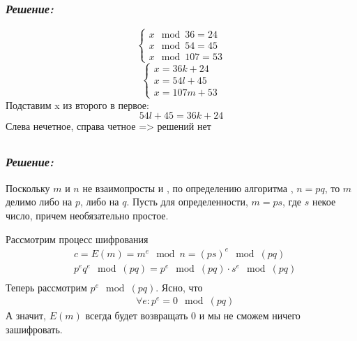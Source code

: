 \documentclass[a4paper, 11pt]{article} %
\newcommand*\circled[1]{\tikz[baseline=(char.base)]{
            \node[shape=circle,draw,inner sep=2pt] (char) {#1};}}
\begin{document}
\subsection*{\circled{5}} 
\subsubsection*{\textit{Решение:}}
\begin{equation}
\begin{cases}
x \mod 36 = 24\\
x \mod 54 = 45 \\
x \mod 107 = 53
\end{cases}
\end{equation} 
\begin{equation}
\begin{cases}
x = 36k + 24\\
x = 54l + 45 \\
x = 107m + 53
\end{cases}
\end{equation}
Подставим x из второго в первое:
\[54l + 45 = 36k + 24 \]
Слева нечетное, справа четное => решений нет
\subsection*{\circled{6}} 
\subsubsection*{\textit{Решение:}}
\par Поскольку $m$ и $n$ не взаимопросты и , по определению алгоритма , $n=pq$, то $m$ делимо либо на $p$, либо  на $q$. Пусть для определенности, $m=ps$, где $s$ некое число, причем необязательно простое. 
\par Рассмотрим процесс шифрования
\begin{align*}
&c = E(m) = m^e \mod n = (ps)^e \mod (pq)\\
&p^eq^e\mod(pq) = p^e\mod(pq)\cdot s^e\mod(pq)\\
\end{align*} 
Теперь рассмотрим $p^e\mod(pq)$. Ясно, что 
\begin{align*}
&\forall e : p^e = 0\mod(pq)
\end{align*}
А значит, $E(m)$ всегда будет возвращать 0 и мы не сможем ничего зашифровать.
\end{document}
